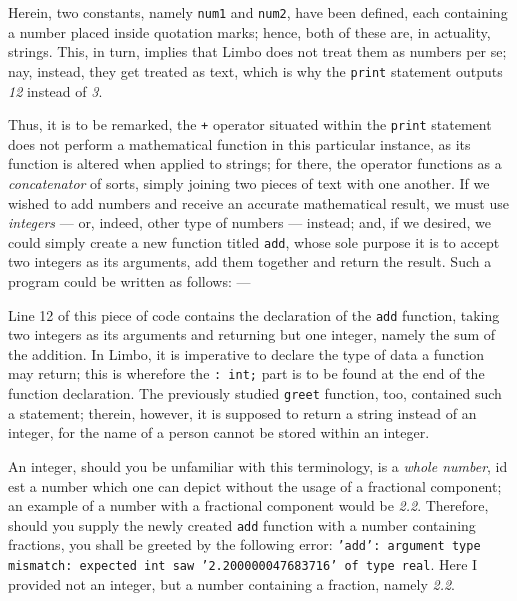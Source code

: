 \documentclass[a5paper,twoside,12pt]{report}
\begin{document}


Herein, two constants, namely \texttt{num1} and \texttt{num2}, have been defined, each containing a number placed inside quotation marks; hence, both of these are, in actuality, strings. This, in turn, implies that Limbo does not treat them as numbers per se; nay, instead, they get treated as text, which is why the \texttt{print} statement outputs \textit{12} instead of \textit{3}. 

Thus, it is to be remarked, the \texttt{+} operator situated within the \texttt{print} statement does not perform a mathematical function in this particular instance, as its function is altered when applied to strings; for there, the operator functions as a \textit{concatenator} of sorts, simply joining two pieces of text with one another. If we wished to add numbers and receive an accurate mathematical result, we must use \textit{integers} — or, indeed, other type of numbers — instead; and, if we desired, we could simply create a new function titled \texttt{add}, whose sole purpose it is to accept two integers as its arguments, add them together and return the result. Such a program could be written as follows: —



Line 12 of this piece of code contains the declaration of the \texttt{add} function, taking two integers as its arguments and returning but one integer, namely the sum of the addition. In Limbo, it is imperative to declare the type of data a function may return; this is wherefore the \texttt{: int;} part is to be found at the end of the function declaration. The previously studied \texttt{greet} function, too, contained such a statement; therein, however, it is supposed to return a string instead of an integer, for the name of a person cannot be stored within an integer. 

An integer, should you be unfamiliar with this terminology, is a \textit{whole number}, id est a number which one can depict without the usage of a fractional component; an example of a number with a fractional component would be \textit{2.2}. Therefore, should you supply the newly created \texttt{add} function with a number containing fractions, you shall be greeted by the following error: \texttt{'add': argument type mismatch: expected int saw '2.200000047683716' of type real}. Here I provided not an integer, but a number containing a fraction, namely \textit{2.2}.
\end{document}
